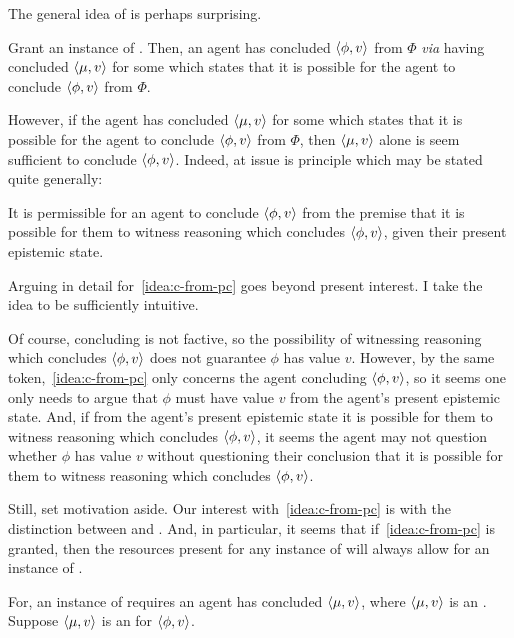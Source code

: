 \begin{note}
  The general idea of \adB{} is perhaps surprising.

  Grant an instance of \adB{}.
  Then, an agent has concluded \(\langle \phi, v \rangle\) from \(\Phi\) \emph{via} having concluded \(\langle \mu, v \rangle\) for some  which states that it is possible for the agent to conclude \(\langle \phi, v \rangle\) from \(\Phi\).

  However, if the agent has concluded \(\langle \mu, v \rangle\) for some  which states that it is possible for the agent to conclude \(\langle \phi, v \rangle\) from \(\Phi\), then \(\langle \mu, v \rangle\) alone is seem sufficient to conclude \(\langle \phi, v \rangle\).
  Indeed, at issue is principle which may be stated quite generally:

  \begin{idea}
    \label{idea:c-from-pc}
    It is permissible for an agent to conclude \(\langle \phi, v \rangle\) from the premise that it is possible for them to witness reasoning which concludes \(\langle \phi, v \rangle\), given their present epistemic state.
  \end{idea}

  Arguing in detail for~\autoref{idea:c-from-pc} goes beyond present interest.
  I take the idea to be sufficiently intuitive.

  Of course, concluding is not factive, so the possibility of witnessing reasoning which concludes \(\langle \phi, v \rangle\) does not guarantee \(\phi\) has value \(v\).
  However, by the same token,~\autoref{idea:c-from-pc} only concerns the agent concluding \(\langle \phi, v \rangle\), so it seems one only needs to argue that \(\phi\) must have value \(v\) from the agent's present epistemic state.
  And, if from the agent's present epistemic state it is possible for them to witness reasoning which concludes \(\langle \phi, v \rangle\), it seems the agent may not question whether \(\phi\) has value \(v\) without questioning their conclusion that it is possible for them to witness reasoning which concludes \(\langle \phi, v \rangle\).

  Still, set motivation aside.
  Our interest with~\autoref{idea:c-from-pc} is with the distinction between \adA{} and \adB{}.
  And, in particular, it seems that if~\autoref{idea:c-from-pc} is granted, then the resources present for any instance of \adB{} will always allow for an instance of \adA{}.

  For, an instance of \adB{} requires an agent has concluded \(\langle \mu, v \rangle\), where \(\langle \mu, v \rangle\) is an .
  Suppose \(\langle \mu, v \rangle\) is an  for \(\langle \phi, v \rangle\).


\end{note}
